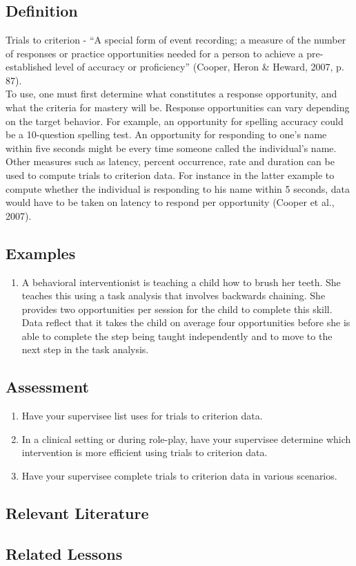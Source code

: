 \clearpage \section{\fouraSeven{}}
\subsection{Definition}
Trials to criterion - ``A special form of event recording; a measure of the number of responses or practice opportunities needed for a person to achieve a pre-established level of accuracy or proficiency'' (Cooper, Heron \& Heward, 2007, p.  87).\\

To use, one must first determine what constitutes a response opportunity, and what the criteria for mastery will be. Response opportunities can vary depending on the target behavior. For example, an opportunity for spelling accuracy could be a 10-question spelling test. An opportunity for responding to one's name within five seconds might be every time someone called the individual's name. Other measures such as latency, percent occurrence, rate and duration can be used to compute trials to criterion data. For instance in the latter example to compute whether the individual is responding to his name within 5 seconds, data would have to be taken on latency to respond per opportunity (Cooper et al., 2007).\\
%
\subsection{Examples}
\begin{enumerate}
\item A behavioral interventionist is teaching a child how to brush her teeth. She teaches this using a task analysis that involves backwards chaining. She provides two opportunities per session for the child to complete this skill. Data reflect that it takes the child on average four opportunities before she is able to complete the step being taught independently and to move to the next step in the task analysis.
\end{enumerate}
%
\subsection{Assessment}
\begin{enumerate}
\item Have your supervisee list uses for trials to criterion data.
\item In a clinical setting or during role-play, have your supervisee determine which intervention is more efficient using trials to criterion data. 
\item Have your supervisee complete trials to criterion data in various scenarios. 
\end{enumerate}
%
\subsection{Relevant Literature}
\begin{refsection}
\nocite{cooper2007applied,lahey1974facilitation}
\printbibliography[heading=none]
\end{refsection}
%
\subsection{Related Lessons}
\fourhOne{}\\
\fourhThree{}\\
